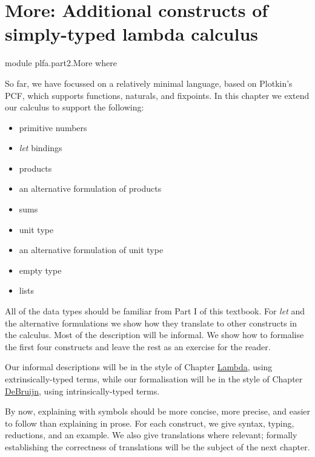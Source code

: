 \hypertarget{More}{%
\chapter{More: Additional constructs of simply-typed lambda
calculus}\label{More}}

\begin{fence}
\begin{code}
module plfa.part2.More where
\end{code}
\end{fence}

So far, we have focussed on a relatively minimal language, based on
Plotkin's PCF, which supports functions, naturals, and fixpoints. In
this chapter we extend our calculus to support the following:

\begin{itemize}
\tightlist
\item
  primitive numbers
\item
  \emph{let} bindings
\item
  products
\item
  an alternative formulation of products
\item
  sums
\item
  unit type
\item
  an alternative formulation of unit type
\item
  empty type
\item
  lists
\end{itemize}

All of the data types should be familiar from Part I of this textbook.
For \emph{let} and the alternative formulations we show how they
translate to other constructs in the calculus. Most of the description
will be informal. We show how to formalise the first four constructs and
leave the rest as an exercise for the reader.

Our informal descriptions will be in the style of Chapter
\protect\hyperlink{Lambda}{Lambda}, using extrinsically-typed terms,
while our formalisation will be in the style of Chapter
\protect\hyperlink{DeBruijn}{DeBruijn}, using intrinsically-typed terms.

By now, explaining with symbols should be more concise, more precise,
and easier to follow than explaining in prose. For each construct, we
give syntax, typing, reductions, and an example. We also give
translations where relevant; formally establishing the correctness of
translations will be the subject of the next chapter.

